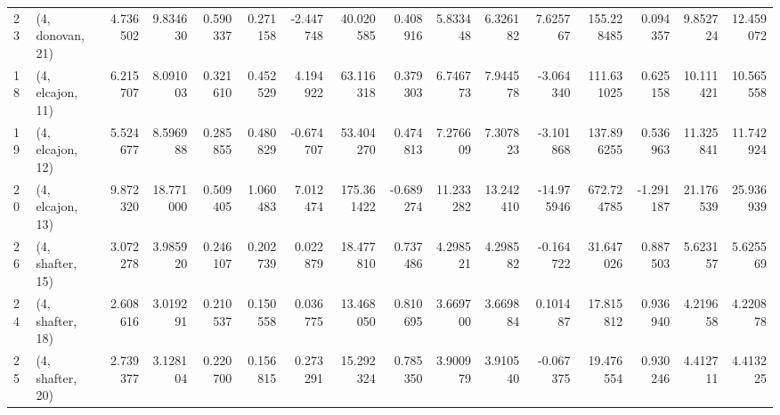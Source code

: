 \begin{tabular}{llrrrrrrrrrrrrrr}
23 &  (4, donovan, 21) &   4.736502 &   9.834630 &   0.590337 &  0.271158 &  -2.447748 &   40.020585 &  0.408916 &   5.833448 &   6.326182 &   7.625767 &   155.228485 &  0.094357 &   9.852724 &  12.459072 \\
18 &  (4, elcajon, 11) &   6.215707 &   8.091003 &   0.321610 &  0.452529 &   4.194922 &   63.116318 &  0.379303 &   6.746773 &   7.944578 &  -3.064340 &   111.631025 &  0.625158 &  10.111421 &  10.565558 \\
19 &  (4, elcajon, 12) &   5.524677 &   8.596988 &   0.285855 &  0.480829 &  -0.674707 &   53.404270 &  0.474813 &   7.276609 &   7.307823 &  -3.101868 &   137.896255 &  0.536963 &  11.325841 &  11.742924 \\
20 &  (4, elcajon, 13) &   9.872320 &  18.771000 &   0.509405 &  1.060483 &   7.012474 &  175.361422 & -0.689274 &  11.233282 &  13.242410 & -14.975946 &   672.724785 & -1.291187 &  21.176539 &  25.936939 \\
26 &  (4, shafter, 15) &   3.072278 &   3.985920 &   0.246107 &  0.202739 &   0.022879 &   18.477810 &  0.737486 &   4.298521 &   4.298582 &  -0.164722 &    31.647026 &  0.887503 &   5.623157 &   5.625569 \\
24 &  (4, shafter, 18) &   2.608616 &   3.019291 &   0.210537 &  0.150558 &   0.036775 &   13.468050 &  0.810695 &   3.669700 &   3.669884 &   0.101487 &    17.815812 &  0.936940 &   4.219658 &   4.220878 \\
25 &  (4, shafter, 20) &   2.739377 &   3.128104 &   0.220700 &  0.156815 &   0.273291 &   15.292324 &  0.785350 &   3.900979 &   3.910540 &  -0.067375 &    19.476554 &  0.930246 &   4.412711 &   4.413225 \\
\bottomrule
\end{tabular}
